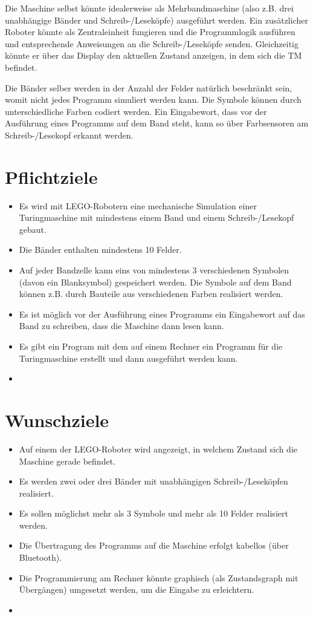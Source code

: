 \documentclass[a4paper,12pt]{article}
\begin{document}
Die Maschine selbst könnte idealerweise als Mehrbandmaschine (also z.B. drei unabhängige Bänder und Schreib-/Leseköpfe) ausgeführt werden. Ein zusätzlicher Roboter könnte als Zentraleinheit fungieren und die Programmlogik ausführen und entsprechende Anweisungen an die Schreib-/Leseköpfe senden. Gleichzeitig könnte er über das Display den aktuellen Zustand anzeigen, in dem sich die TM befindet.

Die Bänder selber werden in der Anzahl der Felder natürlich beschränkt sein, womit nicht jedes Programm simuliert werden kann. Die Symbole können durch unterschiedliche Farben codiert werden. Ein Eingabewort, dass vor der Ausführung eines Programms auf dem Band steht, kann so über Farbsensoren am Schreib-/Lesekopf erkannt werden.


\section{Pflichtziele}

\begin{itemize}
\item Es wird mit LEGO-Robotern eine mechanische Simulation einer Turingmaschine mit mindestens einem Band und einem Schreib-/Lesekopf gebaut.
\item Die Bänder enthalten mindestens 10 Felder.
\item Auf jeder Bandzelle kann eins von mindestens 3 verschiedenen Symbolen (davon ein Blanksymbol) gespeichert werden. Die Symbole auf dem Band können z.B. durch Bauteile aus verschiedenen Farben realisiert werden.
\item Es ist möglich vor der Ausführung eines Programms ein Eingabewort auf das Band zu schreiben, dass die Maschine dann lesen kann. 
\item Es gibt ein Program mit dem auf einem Rechner ein Programm für die Turingmaschine erstellt und dann ausgeführt werden kann.
\item {}
\end{itemize}

\section{Wunschziele}

\begin{itemize}
\item Auf einem der LEGO-Roboter wird angezeigt, in welchem Zustand sich die Maschine gerade befindet.
\item Es werden zwei oder drei Bänder mit unabhängigen Schreib-/Leseköpfen realisiert.
\item Es sollen möglichst mehr als 3 Symbole und mehr als 10 Felder realisiert werden.
\item Die Übertragung des Programms auf die Maschine erfolgt kabellos (über Bluetooth).
\item Die Programmierung am Rechner könnte graphisch (als Zustandsgraph mit Übergängen) umgesetzt werden, um die Eingabe zu erleichtern.
\item {}
\end{itemize}
\end{document}
